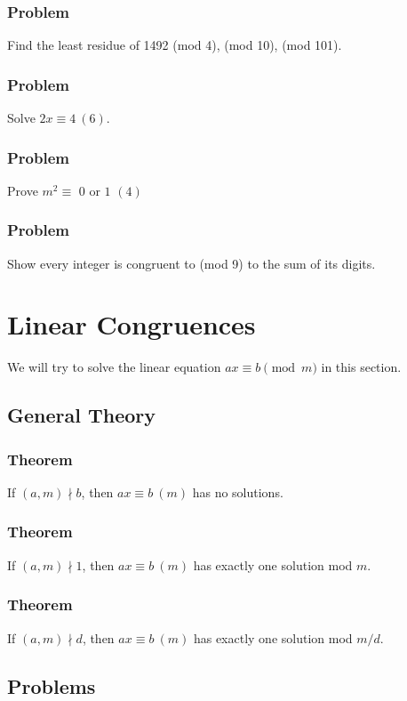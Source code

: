 \documentclass{article}
\begin{document}
\subsubsection{Problem}
Find the least residue of 1492 (mod 4), (mod 10), (mod 101).
\vspace{40px}
\subsubsection{Problem}
Solve $2x \equiv 4 \ (6)$.
\vspace{40px}
\subsubsection{Problem}
Prove $m^2 \equiv \text{ 0 or 1 } (4)$
\vspace{40px}
\subsubsection{Problem}
Show every integer is congruent to (mod 9) to the sum of its digits.
\pagebreak

\section{Linear Congruences}
We will try to solve the linear equation $ax \equiv b \pmod{m}$ in this section.
\subsection{General Theory}
\subsubsection{Theorem}
If $(a, m) \nmid b$, then $ax \equiv b \ (m)$ has no solutions.
\vspace{50px}
\subsubsection{Theorem}
If $(a, m) \nmid 1$, then $ax \equiv b \ (m)$ has exactly one solution mod $m$.
\vspace{50px}
\subsubsection{Theorem}
If $(a, m) \nmid d$, then $ax \equiv b \ (m)$ has exactly one solution mod $m/d$.
\vspace{50px}
\subsection{Problems}
\end{document}
